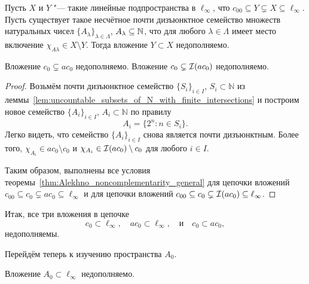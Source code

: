 \begin{theorem}
	\label{thm:Alekhno_noncomplementarity_general}
	Пусть $X$ и $Y$ "--- такие линейные подпространства в $\ell_\infty$,
	что $c_{00} \subseteq Y \subsetneq X \subseteq \ell_\infty$.
	Пусть существует такое несчётное почти дизъюнктное семейство множеств натуральных чисел $\{A_\lambda\}_{\lambda \in \Lambda}$,
	$A_\lambda \subseteq \mathbb{N}$, что для любого $\lambda \in \Lambda$ имеет место включение $\chi_{A\lambda} \in X \setminus Y$.
	Тогда вложение $Y \subset X$ недополняемо.
\end{theorem}

\begin{corollary}
	Вложение $c_0\subsetneq ac_0$ недополняемо.
	Вложение $c_0\subsetneq \mathcal{I}(ac_0)$ недополняемо.
\end{corollary}

\begin{proof}
	Возьмём почти дизъюнктное семейство $\{S_i\}_{i\in I}$, $S_i \subset \mathbb{N}$
	из леммы~\ref{lem:uncountable_subsets_of_N_with_finite_intersections}
	и построим новое семейство $\{A_i\}_{i\in I}$, $A_i \subset \mathbb{N}$
	по правилу
	\begin{equation}
		\label{eq:c0_noncomplemented_in_ac0_set_family}
		A_i = \{ 2^n : n\in S_i \}
		.
	\end{equation}
	Легко видеть, что семейство $\{A_i\}_{i\in I}$ снова является почти дизъюнктным.
	Более того, $\chi_{A_i} \in ac_0 \setminus c_0$ и $\chi_{A_i} \in \mathcal{I}(ac_0) \setminus c_0$ для любого $i\in I$.

	Таким образом, выполнены все условия теоремы~\ref{thm:Alekhno_noncomplementarity_general}
	для цепочки вложений $c_{00} \subseteq c_0 \subsetneq ac_0 \subseteq \ell_\infty$ и
	для цепочки вложений $c_{00} \subseteq c_0 \subsetneq \mathcal{I}(ac_0) \subseteq \ell_\infty$.
\end{proof}


Итак, все три вложения в цепочке
\begin{equation}
	c_0 \subset \ell_\infty,
	\quad
	ac_0 \subset \ell_\infty,
	\quad\mbox{и}\quad
	c_0 \subset ac_0,
\end{equation}
недополняемы.

Перейдём теперь к изучению пространства $A_0$.

\begin{lemma}
	Вложение $A_0 \subset \ell_\infty$ недополняемо.
\end{lemma}

